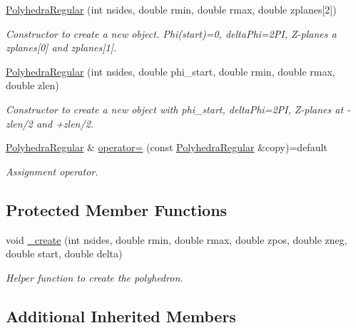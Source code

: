 \begin{DoxyCompactItemize}
\hyperlink{class_d_d4hep_1_1_geometry_1_1_polyhedra_regular_a0fd96974d56ca2fb51494fc69d9c0443}{Polyhedra\+Regular} (int nsides, double rmin, double rmax, double zplanes\mbox{[}2\mbox{]})
\begin{DoxyCompactList}\small\item\em Constructor to create a new object. Phi(start)=0, delta\+Phi=2\+PI, Z-\/planes a zplanes\mbox{[}0\mbox{]} and zplanes\mbox{[}1\mbox{]}. \end{DoxyCompactList}\item 
\hyperlink{class_d_d4hep_1_1_geometry_1_1_polyhedra_regular_a753b26a4ca8dc57fe9f3d1396a9acb81}{Polyhedra\+Regular} (int nsides, double phi\+\_\+start, double rmin, double rmax, double zlen)
\begin{DoxyCompactList}\small\item\em Constructor to create a new object with phi\+\_\+start, delta\+Phi=2\+PI, Z-\/planes at -\/zlen/2 and +zlen/2. \end{DoxyCompactList}\item 
\hyperlink{class_d_d4hep_1_1_geometry_1_1_polyhedra_regular}{Polyhedra\+Regular} \& \hyperlink{class_d_d4hep_1_1_geometry_1_1_polyhedra_regular_a2a90249db54bc0915bfd613aa4071cc3}{operator=} (const \hyperlink{class_d_d4hep_1_1_geometry_1_1_polyhedra_regular}{Polyhedra\+Regular} \&copy)=default
\begin{DoxyCompactList}\small\item\em Assignment operator. \end{DoxyCompactList}\end{DoxyCompactItemize}
\subsection*{Protected Member Functions}
\begin{DoxyCompactItemize}
\item 
void \hyperlink{class_d_d4hep_1_1_geometry_1_1_polyhedra_regular_add1de904bca13df6b2b5e938e1afb7d8}{\+\_\+create} (int nsides, double rmin, double rmax, double zpos, double zneg, double start, double delta)
\begin{DoxyCompactList}\small\item\em Helper function to create the polyhedron. \end{DoxyCompactList}\end{DoxyCompactItemize}
\subsection*{Additional Inherited Members}


